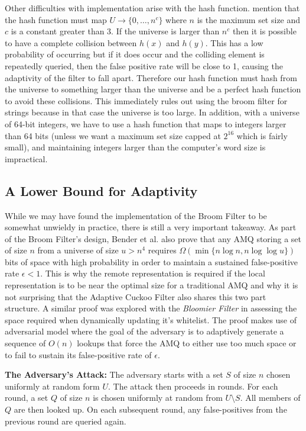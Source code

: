 \documentclass[../paper.tex]{subfiles}
\begin{document}
Other difficulties with implementation arise with the hash function. \cite{broom-filter}
mention that the hash function must map $U \rightarrow \{0,\ldots,n^c\}$ where
$n$ is the maximum set size and $c$ is a constant greater than 3. If the universe
is larger than $n^c$ then it is possible to have a complete collision between
$h(x)$ and $h(y)$. This has a low probability of occurring but if it does
occur and the colliding element is repeatedly queried, then the false positive
rate will be close to 1, causing the adaptivity of the filter to fall apart. Therefore
our hash function must hash from the universe to something larger than the universe
and be a perfect hash function to avoid these collisions. This immediately rules
out using the broom filter for strings because in that case the universe is too large.
In addition, with a universe of 64-bit integers, we have to use a hash function
that maps to integers larger than 64 bits (unless we want a maximum set size capped
at $2^{16}$ which is fairly small), and maintaining integers larger than the computer's
word size is impractical.

\subsection{A Lower Bound for Adaptivity} While we may have found the
implementation of the Broom Filter to be somewhat unwieldy in practice, there
is still a very important takeaway.  As part of the Broom Filter's design,
Bender et al. also prove that any AMQ storing a set of size $n$ from a universe
of size $u > n^4$ requires $\Omega (\min \{n\log n, n\log\log u\})$ bits of
space with high probability in order to maintain a sustained false-positive
rate $\epsilon < 1$.  This is why the remote representation is required if the
local representation is to be near the optimal size for a traditional AMQ and
why it is not surprising that the Adaptive Cuckoo Filter also shares this two
part structure.  A similar proof was explored with the {\it Bloomier Filter} 
\cite{bloomier-filter} in assessing the space required when dynamically 
updating it's whitelist. The proof makes use of adversarial model where the 
goal of the adversary is to adaptively generate a sequence of $O(n)$ lookups 
that force the AMQ to either use too much space or to fail to sustain its 
false-positive rate of $\epsilon$.  
	
	{\bf The Adversary's Attack:} The adversary starts with a set $S$ of size $n$ chosen
	uniformly at random form $U$.  The attack then proceeds in rounds.  For each round, 
	a set $Q$ of size $n$ is chosen uniformly at random from $U\setminus S$.  All members
	of $Q$ are then looked up. On each subsequent round, any false-positives from the 
	previous round are queried again. 
	
\end{document}
